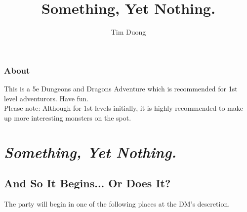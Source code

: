 \documentclass[10pt]{report}
\author{Tim Duong}
\title{Something, Yet Nothing.}
\begin{document}
\maketitle
\tableofcontents

\newpage
\section{About}

	This is a 5e Dungeons and Dragons Adventure which is recommended for 1st level adventurors. Have fun. \\
	
	Please note: Although for 1st levels initially, it is highly recommended to make up more interesting monsters on the spot. 

\part{\textit{Something, Yet Nothing.}}
\chapter{And So It Begins... Or Does It?}

    The party will begin in one of the following places at the DM's descretion.
    
\end{document}
